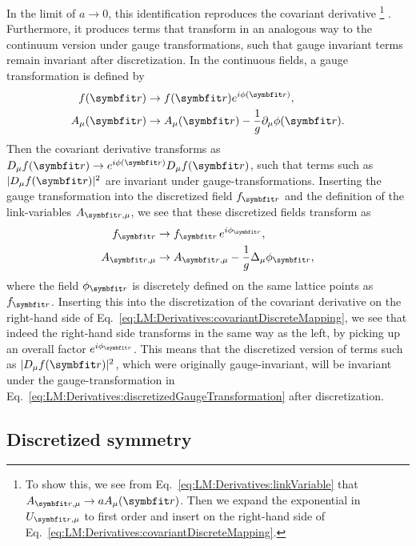 In the limit of $a\to0$, this identification reproduces the covariant derivative%
\footnote{To show this, we see from Eq.~\eqref{eq:LM:Derivatives:linkVariable} that $A_{\v{r},\mu}\to aA_\mu(\v{r})$. Then we expand the exponential
in $U_{\v{r},\mu}$ to first order and insert on the right-hand side of Eq.~\eqref{eq:LM:Derivatives:covariantDiscreteMapping}.}%
. Furthermore, it produces terms that transform in an analogous way to the continuum version under gauge transformations, such that gauge
invariant terms remain invariant after discretization. In the continuous fields, a gauge transformation is defined by
\begin{equation}
    \label{eq:LM:Derivatives:gaugeTransformation}
    \begin{split}
        f(\v{r})&\to f(\v{r})e^{i\phi(\v{r})},\\
        A_\mu(\v{r})&\to A_\mu(\v{r}) - \frac{1}{g}\partial_\mu\phi(\v{r}).
    \end{split}
\end{equation}
Then the covariant derivative transforms as $D_\mu f(\v{r})\to e^{i\phi(\v{r})}D_\mu f(\v{r})$, such that terms such as $|D_\mu f(\v{r})|^2$
are invariant under gauge-transformations. Inserting the gauge transformation into the discretized field $f_\v{r}$ and the definition of the
link-variables $A_{\v{r},\mu}$, we see that these discretized fields transform as
\begin{equation}
    \label{eq:LM:Derivatives:discretizedGaugeTransformation}
    \begin{split}
        f_\v{r}&\to f_\v{r}\,e^{i\phi_\v{r}},\\
        A_{\v{r},\mu}&\to A_{\v{r},\mu} - \frac{1}{g}\Delta_\mu\phi_\v{r},
    \end{split}
\end{equation}
where the field $\phi_\v{r}$ is discretely defined on the same lattice points as $f_\v{r}$. Inserting this into the
discretization of the covariant derivative on the right-hand side of Eq.~\eqref{eq:LM:Derivatives:covariantDiscreteMapping}, we see that indeed
the right-hand side transforms in the same way as the left, \ie by picking up an overall factor $e^{i\phi_{\v{r}}}$. This means that
the discretized version of terms such as $|D_\mu f(\v{r})|^2$, which were originally gauge-invariant, will be invariant
under the gauge-transformation in Eq.~\eqref{eq:LM:Derivatives:discretizedGaugeTransformation} after discretization.

\subsection{Discretized symmetry}

